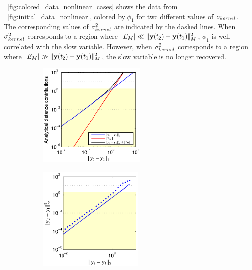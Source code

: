 \fig~\ref{fig:colored_data_nonlinear_cases} shows the data from \fig~\ref{fig:initial_data_nonlinear}, colored by $\phi_1$ for two different values of $\sigma_{kernel}$.
%
The corresponding values of $\sigma_{kernel}^2$ are indicated by the dashed lines.
%
When $\sigma_{kernel}^2$ corresponds to a region where $ |E_M | \ll \|\mathbf{y}(t_2) - \mathbf{y}(t_1) \|_M^2$, $\phi_1$ is well correlated with the slow variable.
%
However, when $\sigma_{kernel}^2$ corresponds to a region where $|E_M | \gg \|\mathbf{y}(t_2) - \mathbf{y}(t_1) \|_M^2$, the slow variable is no longer recovered.

\begin{figure}[t]
\centering
\begin{subfigure}{0.4\textwidth}
\centering
\includegraphics[height=2in]{dist_dy_analytical_nonlinear}
\caption{}
\label{subfig:dist_error_nonlinear1}
\end{subfigure}
%
\begin{subfigure}{0.4\textwidth}
\centering
\includegraphics[height=2in]{dist_dy_nonlinear}
\caption{}
\label{subfig:dist_error_nonlinear2}
\end{subfigure}


\end{figure}
